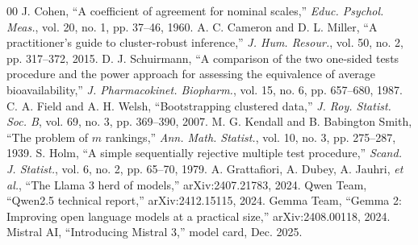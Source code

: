 \documentclass[conference]{IEEEtran}
\begin{document}
\begin{thebibliography}{00}
 J. Cohen, ``A coefficient of agreement for nominal scales,'' \textit{Educ. Psychol. Meas.}, vol. 20, no. 1, pp. 37--46, 1960.
 A. C. Cameron and D. L. Miller, ``A practitioner's guide to cluster-robust inference,'' \textit{J. Hum. Resour.}, vol. 50, no. 2, pp. 317--372, 2015.
 D. J. Schuirmann, ``A comparison of the two one-sided tests procedure and the power approach for assessing the equivalence of average bioavailability,'' \textit{J. Pharmacokinet. Biopharm.}, vol. 15, no. 6, pp. 657--680, 1987.
 C. A. Field and A. H. Welsh, ``Bootstrapping clustered data,'' \textit{J. Roy. Statist. Soc. B}, vol. 69, no. 3, pp. 369--390, 2007.
 M. G. Kendall and B. Babington Smith, ``The problem of $m$ rankings,'' \textit{Ann. Math. Statist.}, vol. 10, no. 3, pp. 275--287, 1939.
 S. Holm, ``A simple sequentially rejective multiple test procedure,'' \textit{Scand. J. Statist.}, vol. 6, no. 2, pp. 65--70, 1979.
 A. Grattafiori, A. Dubey, A. Jauhri, \textit{et al.}, ``The Llama 3 herd of models,'' arXiv:2407.21783, 2024.
 Qwen Team, ``Qwen2.5 technical report,'' arXiv:2412.15115, 2024.
 Gemma Team, ``Gemma 2: Improving open language models at a practical size,'' arXiv:2408.00118, 2024.
 Mistral AI, ``Introducing Mistral 3,'' model card, Dec. 2025.
\end{thebibliography}
\end{document}
